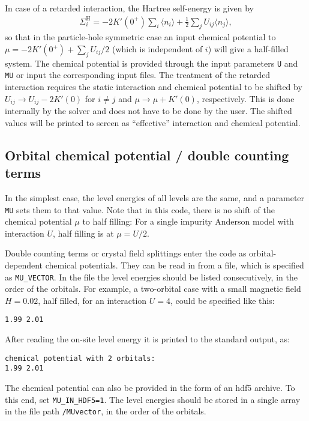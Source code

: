 \documentclass[aps,prb,floatfix,superscriptaddress,twocolumn,notitlepage]{revtex4-1}
\begin{document}
In case of a retarded interaction, the Hartree self-energy is given by
\begin{align}
\Sigma^{\text{H}}_{i} = - 2K'(0^{+})\sum_{i}\langle n_{i}\rangle +\frac{1}{2}\sum_{j}U_{ij}\langle n_{j}\rangle ,
\end{align}
so that in the particle-hole symmetric case an input chemical potential to $\mu=-2K'(0^{+})+\sum_{j}U_{ij}/2$ (which is independent of $i$) will give a half-filled system. The chemical potential is provided through the input parameters \verb#U# and \verb#MU# or input the corresponding input files.
The treatment of the retarded interaction requires the static interaction and chemical potential to be shifted by $U_{ij}\to U_{ij}-2K'(0)$ for $i\neq j$ and $\mu\to \mu+K'(0)$, respectively. This is done internally by the solver and does not have to be done by the user. The shifted values will be printed to screen as ``effective'' interaction and chemical potential.

\subsection{Orbital chemical potential / double counting terms}
\label{sec:mu}
In the simplest case, the level energies of all levels are the same, and a parameter \verb#MU# sets them to that value. Note that in this code, there is no shift of the chemical potential $\mu$ to half filling: For a single impurity Anderson model with interaction $U$, half filling is at $\mu=U/2$.

Double counting terms or crystal field splittings enter the code as orbital-dependent chemical potentials. They can be read in from a file, which is specified as \verb#MU_VECTOR#. In the file the level energies should be listed consecutively, in the order of the orbitals. For example, a two-orbital case with a small magnetic field $H=0.02$, half filled, for an interaction $U=4$, could be specified like this:
\begin{verbatim}
1.99 2.01
\end{verbatim}
After reading the on-site level energy it is printed to the standard output, as:
\begin{verbatim}
chemical potential with 2 orbitals: 
1.99 2.01 
\end{verbatim}
The chemical potential can also be provided in the form of an hdf5 archive. To this end, set \verb#MU_IN_HDF5=1#. The level energies should be stored in a single array in the file path \verb#/MUvector#, in the order of the orbitals.
\end{document}
